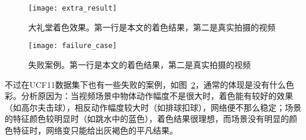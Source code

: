   \begin{figure}[H]
    \centering
    \texttt{[image: extra\_result]}
    \caption[大礼堂着色效果]{大礼堂着色效果。第一行是本文的着色结果，第二是真实拍摄的视频}
    \label{fig:extra_result}
  \end{figure}

  \begin{figure}[H]
    \centering
    \texttt{[image: failure\_case]}
    \caption[失败案例]{失败案例。第一行是本文的着色结果，第二是真实拍摄的视频}
    \label{fig:failure_case}
  \end{figure}  

  不过在UCF11数据集下也有一些失败的案例，如图~\ref{fig:failure_case}，通常的体现是没有什么色彩。分析原因为：当视频场景中物体动作幅度不是很大时，着色能有较好的效果（如高尔夫击球），相反动作幅度较大时（如排球扣球），网络便不那么稳定；场景的特征颜色较明显时（如跳水中的蓝色），着色结果很理想，而场景没有明显的颜色特征时，网络变只能给出灰褐色的平凡结果。





  